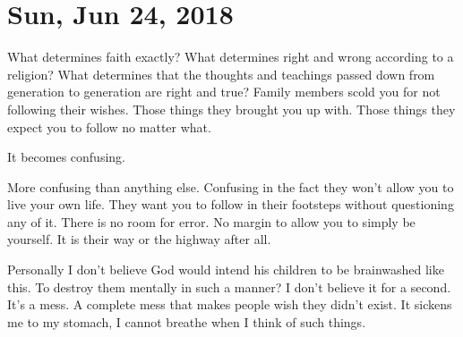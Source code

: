 \section{Sun, Jun 24, 2018}

What determines faith exactly? What determines right and wrong according to a
religion? What determines that the thoughts and teachings passed down from
generation to generation are right and true? Family members scold you for not
following their wishes. Those things they brought you up with. Those things they
expect you to follow no matter what.

It becomes confusing.

More confusing than anything else. Confusing in the fact they won't allow you to
live your own life. They want you to follow in their footsteps without
questioning any of it. There is no room for error. No margin to allow you to
simply be yourself. It is their way or the highway after all.

Personally I don't believe God would intend his children to be brainwashed like
this. To destroy them mentally in such a manner? I don't believe it for a
second. It's a mess. A complete mess that makes people wish they didn't exist.
It sickens me to my stomach, I cannot breathe when I think of such things.